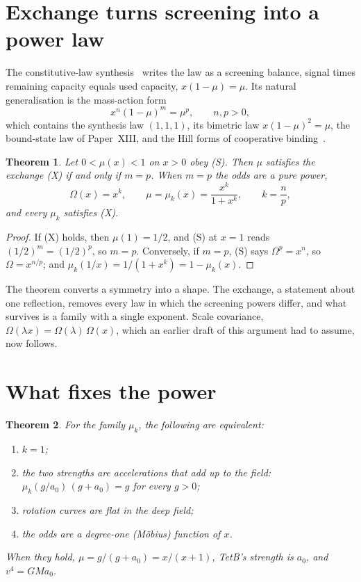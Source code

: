 \documentclass[twocolumn]{iopjournal}
\newtheorem{theorem}{Theorem}
\theoremstyle{definition}
\theoremstyle{remark}
\begin{document}
\section*{Exchange turns screening into a power law}

The constitutive-law synthesis~\cite{NelsonSynth} writes the law as a
screening balance, signal times remaining capacity equals used capacity,
$x(1-\mu) = \mu$. Its natural generalisation is the mass-action form
\begin{equation}
  x^n (1-\mu)^m = \mu^p, \qquad n, p > 0, \tag{S}
\end{equation}
which contains the synthesis law $(1,1,1)$, its bimetric law
$x(1-\mu)^2 = \mu$, the bound-state law of Paper~XIII, and the Hill forms of
cooperative binding~\cite{Hill1910}.

\begin{theorem}\label{thm:power}
Let $0 < \mu(x) < 1$ on $x > 0$ obey (S). Then $\mu$ satisfies the
exchange (X) if and only if $m = p$. When $m = p$ the odds are a pure
power,
\begin{equation}
  \Omega(x) = x^k, \qquad \mu = \mu_k(x) = \frac{x^k}{1 + x^k}, \qquad
  k = \frac{n}{p},
\end{equation}
and every $\mu_k$ satisfies (X).
\end{theorem}

\begin{proof}
If (X) holds, then $\mu(1) = 1/2$, and (S) at $x = 1$ reads
$(1/2)^m = (1/2)^p$, so $m = p$. Conversely, if $m = p$, (S) says
$\Omega^p = x^n$, so $\Omega = x^{n/p}$; and
$\mu_k(1/x) = 1/(1+x^k) = 1 - \mu_k(x)$.
\end{proof}

The theorem converts a symmetry into a shape. The exchange, a statement
about one reflection, removes every law in which the screening powers
differ, and what survives is a family with a single exponent. Scale
covariance, $\Omega(\lambda x) = \Omega(\lambda)\,\Omega(x)$, which an
earlier draft of this argument had to assume, now follows.

\section*{What fixes the power}

\begin{theorem}\label{thm:k}
For the family $\mu_k$, the following are equivalent:
\begin{enumerate}
\item[(i)] $k = 1$;
\item[(ii)] the two strengths are accelerations that add up to the field:
  $\mu_k(g/a_0)\,(g + a_0) = g$ for every $g > 0$;
\item[(iii)] rotation curves are flat in the deep field;
\item[(iv)] the odds are a degree-one (Möbius) function of $x$.
\end{enumerate}
When they hold, $\mu = g/(g+a_0) = x/(x+1)$, TetB's strength is $a_0$, and
$v^4 = GMa_0$.
\end{theorem}
\end{document}
